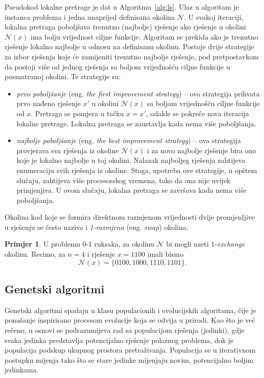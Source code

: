 \documentclass[b5paper, utf8, 11pt, colorlinks]{book}
\theoremstyle{definition}
\newtheorem{primjer}{Primjer}[chapter]
\begin{document}
 Pseudokod lokalne pretrage je dat u Algoritmu~\ref{alg:ls}. Ulaz u algoritam je instanca problema i jedna unaprijed definisana okolina $\mathcal{N}$. U svakoj iteraciji, lokalna pretraga poboljšava trenutno (najbolje) rješenje ako    rješenje u okolini  $\mathcal{N}(x)$ ima bolju vrijednost ciljne funkcije. Algoritam se prekida ako je trenutno rješenje lokalno najbolje u odnosu na definisanu okolinu.
 Postoje dvije strategije za izbor rješenja koje će zamijeniti trenutno najbolje rješenje, pod pretpostavkom da postoji više od jednog rješenja sa boljom vrijednošću ciljne funkcije u posmatranoj okolini. Te strategije su:
 \begin{itemize}
 	\item \emph{prvo poboljšanje} (eng. \emph{the first improvement strategy}) -- ova strategija prihvata prvo nađeno rješenje $x'$ u okolini $\mathcal{N}(x)$ sa boljom vrijednošću ciljne funkcije od $x$. Pretraga se  pomjera u tačku  $x = x'$, odakle se pokreće nova iteracija lokalne pretrage. Lokalna pretraga se zaustavlja kada nema više poboljšanja.
 	\item \emph{najbolje poboljšanje} (eng. \emph{the best improvement strategy}) --   ova strategija provjerava sva rješenja iz okoline $\mathcal{N}(x)$ i za novo najbolje rješenje bira ono koje je lokalno najbolje u toj okolini. Nalazak  najboljeg rješenja zahtijeva enumeraciju svih rješenja iz okoline. Stoga, upotreba ove strategije, u opštem slučaju, zahtijeva više procesorskog vremena, tako da ona nije uvijek primjenjiva. U ovom slučaju, lokalna pretraga se završava kada nema više poboljšanja. %
 \end{itemize}
 Okolina kod koje se formira direktnom razmjenom vrijednosti dvije promjenljive u rješenju se često naziva i \emph{1-razmjena} (eng. \emph{swap}) okolina.
 \begin{primjer} U   problemu 0-1 ruksaka, za okolinu $\mathcal{N}$ bi mogli uzeti $1$-\emph{exchange} okolinu. Recimo, za $n=4$ i rješenje $x=1100$ imali  bismo $$\mathcal{N}(x)= \{ 0100, 1000, 1110, 1101 \}.$$ 
 \end{primjer}
 
 
 \subsection{Genetski algoritmi}\label{intro:ga}
 
 
 Genetski algoritmi spadaju u klasu populacionih i evolucijskih algoritama, čije je ponašanje inspirisano procesom evolucije koja se odvija u prirodi.
 Kao što je već rečeno, u osnovi se podrazumijeva rad sa populacijom rješenja (jedinki), gdje svaka jedinka predstavlja potencijalno rješenje polaznog problema, dok je populacija  podskup ukupnog prostora pretraživanja. Populacija se u iterativnom postupku mijenja tako što se stare jedinke mijenjaju novim, potencijalno boljim jedinkama.
 
\end{document}
